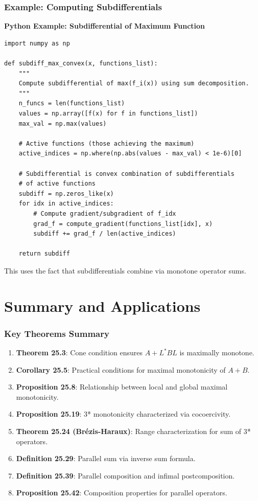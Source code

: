 \documentclass[aspectratio=169,10pt]{beamer}
\begin{document}
\begin{frame}[fragile]
  \frametitle{Example: Computing Subdifferentials}

  \textbf{Python Example: Subdifferential of Maximum Function}

  \begin{lstlisting}
import numpy as np

def subdiff_max_convex(x, functions_list):
    """
    Compute subdifferential of max(f_i(x)) using sum decomposition.
    """
    n_funcs = len(functions_list)
    values = np.array([f(x) for f in functions_list])
    max_val = np.max(values)

    # Active functions (those achieving the maximum)
    active_indices = np.where(np.abs(values - max_val) < 1e-6)[0]

    # Subdifferential is convex combination of subdifferentials
    # of active functions
    subdiff = np.zeros_like(x)
    for idx in active_indices:
        # Compute gradient/subgradient of f_idx
        grad_f = compute_gradient(functions_list[idx], x)
        subdiff += grad_f / len(active_indices)

    return subdiff
  \end{lstlisting}

  \vspace{0.2cm}

  This uses the fact that subdifferentials combine via monotone operator sums.

\end{frame}

\section{Summary and Applications}

\begin{frame}
  \frametitle{Key Theorems Summary}

  \begin{enumerate}
    \item \textbf{Theorem 25.3}: Cone condition ensures $A + L^*BL$ is maximally monotone.
    \item \textbf{Corollary 25.5}: Practical conditions for maximal monotonicity of $A + B$.
    \item \textbf{Proposition 25.8}: Relationship between local and global maximal monotonicity.
    \item \textbf{Proposition 25.19}: 3* monotonicity characterized via cocoercivity.
    \item \textbf{Theorem 25.24 (Brézis-Haraux)}: Range characterization for sum of 3* operators.
    \item \textbf{Definition 25.29}: Parallel sum via inverse sum formula.
    \item \textbf{Definition 25.39}: Parallel composition and infimal postcomposition.
    \item \textbf{Proposition 25.42}: Composition properties for parallel operators.
  \end{enumerate}

\end{frame}
\end{document}
